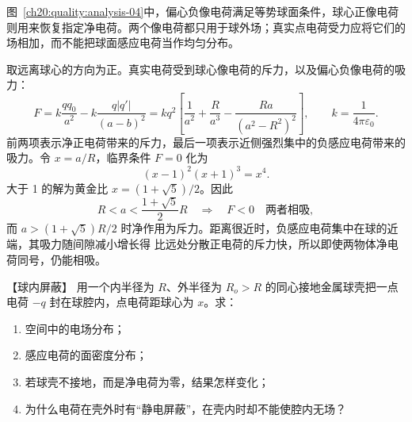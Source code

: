 {\begin{xesolution}
\begin{qualityfigure}
\chargedIsolatedSphereImageFigure
{}\label{ch20:quality:analysis-04}
\end{qualityfigure}
图~\ref{ch20:quality:analysis-04}中，偏心负像电荷满足等势球面条件，球心正像电荷则用来恢复指定净电荷。两个像电荷都只用于球外场；真实点电荷受力应将它们的场相加，而不能把球面感应电荷当作均匀分布。

取远离球心的方向为正。真实电荷受到球心像电荷的斥力，以及偏心负像电荷的吸力：
\[
  F=k\frac{qq_0}{a^2}-k\frac{q|q'|}{(a-b)^2}
  =kq^2\left[\frac1{a^2}+\frac{R}{a^3}
  -\frac{Ra}{(a^2-R^2)^2}\right],
  \qquad k=\frac1{4\pi\varepsilon_0}.
\]
前两项表示净正电荷带来的斥力，最后一项表示近侧强烈集中的负感应电荷带来的吸力。令 $x=a/R$，临界条件
$F=0$ 化为
\[
  (x-1)^2(x+1)^3=x^4.
\]
大于 1 的解为黄金比 $x=(1+\sqrt5)/2$。因此
\[
  \boxed{R<a<\frac{1+\sqrt5}{2}R\quad\Longrightarrow\quad F<0\quad\text{两者相吸}},
\]
而 $a>(1+\sqrt5)R/2$ 时净作用为斥力。距离很近时，负感应电荷集中在球的近端，其吸力随间隙减小增长得
比远处分散正电荷的斥力快，所以即使两物体净电荷同号，仍能相吸。
\end{xesolution}



\begin{origexamplebox}{【球内屏蔽】}\label{ch20:ex:s34-3-5}
用一个内半径为 $R$、外半径为 $R_o>R$ 的同心接地金属球壳把一点电荷 $-q$ 封在球腔内，点电荷距球心为 $x$。求：
\begin{enumerate}[label=(\arabic*)]
  \item 空间中的电场分布；
  \item 感应电荷的面密度分布；
  \item 若球壳不接地，而是净电荷为零，结果怎样变化；
  \item 为什么电荷在壳外时有“静电屏蔽”，在壳内时却不能使腔内无场？
\end{enumerate}
\begin{center}
\end{center}
\end{origexamplebox}}
